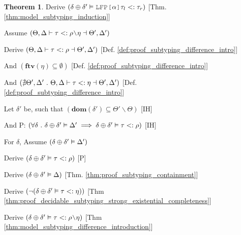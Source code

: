 \documentclass[acmsmall]{acmart}
\theoremstyle{definition}
\newtheorem{theorem}{Theorem}[section]
\begin{document}
\begin{theorem}
  \item \I\I \N Derive $(
    \delta \oplus \delta' \satisfies \J{LFP[}\alpha\J{]}\tau_l \subtypes \tau_r
  )$ [Thm. \ref{thm:model_subtyping_induction}]


  \item \N Assume $(
    \Theta, \Delta \entails 
    \tau \subtypes \rho \typdiff \eta
    \given \Theta', \Delta'
  )$
  \item \I \N Derive $(
    \Theta, \Delta \vdash 
    \tau <: \rho \dashv \Theta', \Delta' 
  )$ [Def. \ref{def:proof_subtyping_difference_intro}]
  \item \I \N And $(
    \textbf{ftv}(\eta) \subseteq \emptyset
  )$ [Def. \ref{def:proof_subtyping_difference_intro}]
  \item \I \N And $(
    \nexists \Theta', \Delta' \ .\   
    \Theta, \Delta \vdash 
    \tau <: \eta \dashv \Theta', \Delta'
  )$ [Def. \ref{def:proof_subtyping_difference_intro}]

  \item \I \N Let $\delta'$ be, such that $(
    \textbf{dom}(\delta') \subseteq \Theta' \backslash \Theta
  )$ [IH]

  \item \I \N And P: $(
    \forall \delta \ .\ 
    \delta \oplus \delta' \vDash \Delta'
    \implies
    \delta \oplus \delta' \vDash \tau <: \rho
  )$ [IH]

  \item \I \N For $\delta$, Assume $(
    \delta \oplus \delta' \vDash \Delta'
  )$

  \item \I\I \N Derive $(
    \delta \oplus \delta' \vDash \tau <: \rho
  )$ [P]

  \item \I\I \N Derive $(
    \delta \oplus \delta' \vDash \Delta
  )$ [Thm. \ref{thm:proof_subtyping_containment}]

  \item \I\I \N Derive $(
    \neg (\delta \oplus \delta' \vDash \tau <: \eta)
  )$ [Thm \ref{thm:proof_decidable_subtyping_strong_existential_completeness}]

  \item \I\I \N Derive $(
    \delta \oplus \delta' \satisfies \tau \subtypes \rho \typdiff \eta
  )$ [Thm \ref{thm:model_subtyping_difference_introduction}]




\end{theorem}
\end{document}
